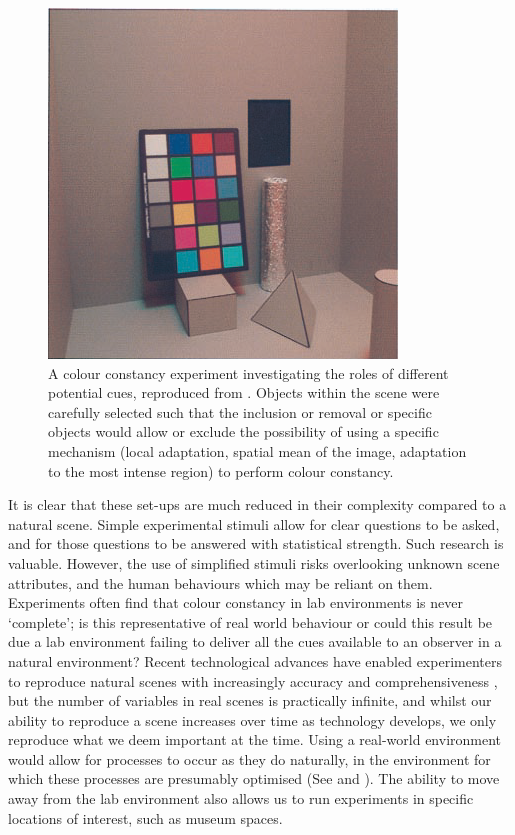 \begin{figure}[htbp]
\includegraphics[max width=\textwidth]{figs/tablet/KraftBrainard.png}
\caption{A colour constancy experiment investigating the roles of different potential cues, reproduced from \citet{kraft_mechanisms_1999}. Objects within the scene were carefully selected such that the inclusion or removal or specific objects would allow or exclude the possibility of using a specific mechanism (local adaptation, spatial mean of the image, adaptation to the most intense region) to perform colour constancy.}
\label{fig:KraftBrainard}
\end{figure}

It is clear that these set-ups are much reduced in their complexity compared to a natural scene. Simple experimental stimuli allow for clear questions to be asked, and for those questions to be answered with statistical strength. Such research is valuable. However, the use of simplified stimuli risks overlooking unknown scene attributes, and the human behaviours which may be reliant on them. Experiments often find that colour constancy in lab environments is never `complete'; is this representative of real world behaviour or could this result be due a lab environment failing to deliver all the cues available to an observer in a natural environment? Recent technological advances have enabled experimenters to reproduce natural scenes with increasingly accuracy and comprehensiveness \citep{heasly_rendertoolbox3_2014}, but the number of variables in real scenes is practically infinite, and whilst our ability to reproduce a scene increases over time as technology develops, we only reproduce what we deem important at the time. Using a real-world environment would allow for processes to occur as they do naturally, in the environment for which these processes are presumably optimised (See \citet{kelly_chips_2018} and \citet{shepard_perceptual_1992}). The ability to move away from the lab environment also allows us to run experiments in specific locations of interest, such as museum spaces.

